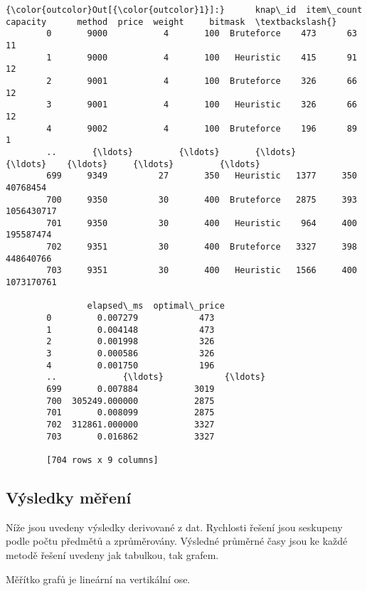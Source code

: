 \documentclass[11pt]{article}
\begin{document}
\begin{Verbatim}[commandchars=\\\{\}]
{\color{outcolor}Out[{\color{outcolor}1}]:}      knap\_id  item\_count  capacity      method  price  weight     bitmask  \textbackslash{}
        0       9000           4       100  Bruteforce    473      63          11   
        1       9000           4       100   Heuristic    415      91          12   
        2       9001           4       100  Bruteforce    326      66          12   
        3       9001           4       100   Heuristic    326      66          12   
        4       9002           4       100  Bruteforce    196      89           1   
        ..       {\ldots}         {\ldots}       {\ldots}         {\ldots}    {\ldots}     {\ldots}         {\ldots}   
        699     9349          27       350   Heuristic   1377     350    40768454   
        700     9350          30       400  Bruteforce   2875     393  1056430717   
        701     9350          30       400   Heuristic    964     400   195587474   
        702     9351          30       400  Bruteforce   3327     398   448640766   
        703     9351          30       400   Heuristic   1566     400  1073170761   
        
                elapsed\_ms  optimal\_price  
        0         0.007279            473  
        1         0.004148            473  
        2         0.001998            326  
        3         0.000586            326  
        4         0.001750            196  
        ..             {\ldots}            {\ldots}  
        699       0.007884           3019  
        700  305249.000000           2875  
        701       0.008099           2875  
        702  312861.000000           3327  
        703       0.016862           3327  
        
        [704 rows x 9 columns]
\end{Verbatim}
            
    \subsection{Výsledky měření}\label{vuxfdsledky-mux11bux159enuxed}

Níže jsou uvedeny výsledky derivované z dat. Rychlosti řešení jsou
seskupeny podle počtu předmětů a zprůměrovány. Výsledné průměrné časy
jsou ke každé metodě řešení uvedeny jak tabulkou, tak grafem.

Měřítko grafů je lineární na vertikální ose.
\end{document}
